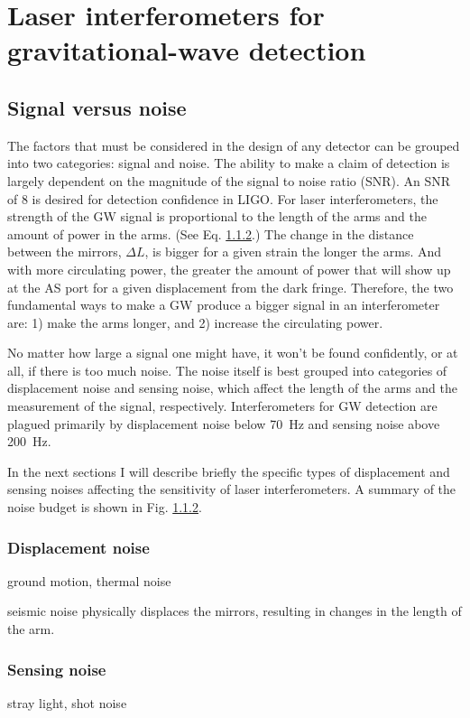 \chapter{Laser interferometers for gravitational-wave detection}

\section{Signal versus noise}
The factors that must be considered in the design of any detector can
be grouped into two categories: signal and noise. The ability to make
a claim of detection is largely dependent on the magnitude of the
signal to noise ratio (SNR). An SNR of 8 is desired for detection
confidence in LIGO. For laser interferometers, the strength of the GW
signal is proportional to the length of the arms and the amount of
power in the arms. (See Eq. \ref{}.) The change in the distance
between the mirrors, $\Delta L$, is bigger for a given strain the
longer the arms. And with more circulating power, the greater the
amount of power that will show up at the AS port for a given
displacement from the dark fringe. Therefore, the two fundamental ways
to make a GW produce a bigger signal in an interferometer are: 1) make
the arms longer, and 2) increase the circulating power.

No matter how large a signal one might have, it won't be found
confidently, or at all, if there is too much noise. The noise itself
is best grouped into categories of displacement noise and sensing
noise, which affect the length of the arms and the measurement of the
signal, respectively. Interferometers for GW detection are plagued
primarily by displacement noise below 70~Hz and sensing noise above
200~Hz.

In the next sections I will describe briefly the specific types of
displacement and sensing noises affecting the sensitivity of laser
interferometers. A summary of the noise budget is shown in
Fig. \ref{}. 


\subsection{Displacement noise} 
ground motion, thermal noise

seismic noise physically displaces the mirrors, resulting in changes in the length
of the arm. 

\subsection{Sensing noise}
stray light, shot noise


